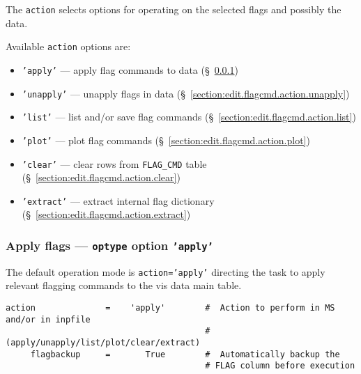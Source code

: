 The {\tt action} selects options for operating on the selected
flags and possibly the data.

Available {\tt action} options are:
\begin{itemize}
   \item {\tt 'apply'} --- apply flag commands to data (\S~\ref{section:edit.flagcmd.action.apply})
   \item {\tt 'unapply'} --- unapply flags in data (\S~\ref{section:edit.flagcmd.action.unapply})
   \item {\tt 'list'} ---  list and/or save flag commands (\S~\ref{section:edit.flagcmd.action.list})
   \item {\tt 'plot'} --- plot flag commands (\S~\ref{section:edit.flagcmd.action.plot})
   \item {\tt 'clear'} --- clear rows from {\tt FLAG\_CMD} table (\S~\ref{section:edit.flagcmd.action.clear})
   \item {\tt 'extract'} --- extract internal flag dictionary (\S~\ref{section:edit.flagcmd.action.extract})
\end{itemize}

\subsubsection{Apply flags --- {\tt optype} option {\tt 'apply'}}
\label{section:edit.flagcmd.action.apply}

The default operation mode is {\tt action='apply'} directing the
task to apply relevant flagging commands to the vis data main table.

\small
\begin{verbatim}
action              =    'apply'        #  Action to perform in MS and/or in inpfile
                                        #   (apply/unapply/list/plot/clear/extract)
     flagbackup     =       True        #  Automatically backup the
                                        # FLAG column before execution

\end{verbatim}
\normalsize
%
%

